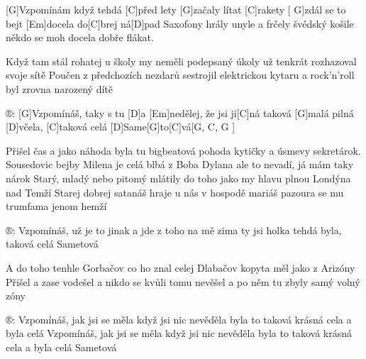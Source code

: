 
[G]Vzpomínám když tehdá [C]před lety [G]začaly lítat [C]rakety  [
G]zdál se to bejt [Em]docela do[C]brej ná[D]pad
Saxofony hrály unyle a frčely švédský košile
někdo se moh docela dobře flákat.

Když tam stál rohatej u školy my neměli podepsaný úkoly
už tenkrát rozhazoval svoje sítě
Poučen z předchozích nezdarů sestrojil elektrickou kytaru
a rock'n'roll byl zrovna narozený dítě

®: [G]Vzpomínáš, taky s tu [D] a [Em]nedělej, že jsi ji[C]ná
taková [G]malá pilná [D]včela, [C]taková celá [D]Same[G]to[C]vá[G, C, G
]

Přišel čas a jako náhoda byla tu bigbeatová pohoda
kytičky a úsmevy sekretárok.
Sousedovic bejby Milena je celá blbá z Boba Dylana
ale to nevadí, já mám taky nárok
Starý, mladý nebo pitomý mlátily do toho jako my
hlavu plnou Londýna nad Temží
Starej dobrej satanáš hraje u nás v hospodě mariáš
pazoura se mu trumfama jenom hemží

®: Vzpomínáš, už je to jinak a jde z toho na mě zima
ty jsi holka tehdá byla, taková celá Sametová

A do toho tenhle Gorbačov co ho znal celej Dlabačov
kopyta měl jako z Arizóny
Přišel a zase vodešel a nikdo se kvůli tomu nevěšel
a po něm tu zbyly samý volný zóny

®: Vzpomínáš, jak jsi se měla když jsi nic nevěděla
byla to taková krásná cela a byla celá
Vzpomínáš, jak jsi se měla když jsi nic nevěděla
byla to taková krásná cela a byla celá Sametová


